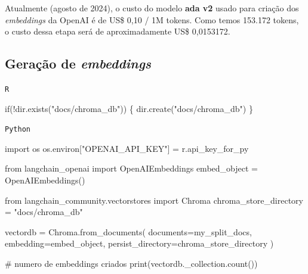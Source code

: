 \documentclass[
  letterpaper,
  DIV=11,
  numbers=noendperiod]{scrartcl}
\newenvironment{Shaded}{\begin{snugshade}}{\end{snugshade}}
\newcommand{\BuiltInTok}[1]{\textcolor[rgb]{0.00,0.23,0.31}{#1}}
\newcommand{\CommentTok}[1]{\textcolor[rgb]{0.37,0.37,0.37}{#1}}
\newcommand{\ControlFlowTok}[1]{\textcolor[rgb]{0.00,0.23,0.31}{#1}}
\newcommand{\FunctionTok}[1]{\textcolor[rgb]{0.28,0.35,0.67}{#1}}
\newcommand{\ImportTok}[1]{\textcolor[rgb]{0.00,0.46,0.62}{#1}}
\newcommand{\NormalTok}[1]{\textcolor[rgb]{0.00,0.23,0.31}{#1}}
\newcommand{\OperatorTok}[1]{\textcolor[rgb]{0.37,0.37,0.37}{#1}}
\newcommand{\SpecialCharTok}[1]{\textcolor[rgb]{0.37,0.37,0.37}{#1}}
\newcommand{\StringTok}[1]{\textcolor[rgb]{0.13,0.47,0.30}{#1}}
\begin{document}
Atualmente (agosto de 2024), o custo do modelo \textbf{ada v2} usado
para criação dos \emph{embeddings} da OpenAI é de US\$ 0,10 / 1M tokens.
Como temos 153.172 tokens, o custo dessa etapa será de aproximadamente
US\$ 0,0153172.

\hypertarget{gerauxe7uxe3o-de-embeddings}{%
\subsection{\texorpdfstring{Geração de
\emph{embeddings}}{Geração de embeddings}}\label{gerauxe7uxe3o-de-embeddings}}

\begin{codelisting}

\caption{\texttt{R}}

\begin{Shaded}
\begin{Highlighting}[]
\ControlFlowTok{if}\NormalTok{(}\SpecialCharTok{!}\FunctionTok{dir.exists}\NormalTok{(}\StringTok{"docs/chroma\_db"}\NormalTok{)) \{}
  \FunctionTok{dir.create}\NormalTok{(}\StringTok{"docs/chroma\_db"}\NormalTok{)}
\NormalTok{\}}
\end{Highlighting}
\end{Shaded}

\end{codelisting}

\begin{codelisting}

\caption{\texttt{Python}}

\begin{Shaded}
\begin{Highlighting}[]
\ImportTok{import}\NormalTok{ os}
\NormalTok{os.environ[}\StringTok{"OPENAI\_API\_KEY"}\NormalTok{] }\OperatorTok{=}\NormalTok{ r.api\_key\_for\_py }

\ImportTok{from}\NormalTok{ langchain\_openai }\ImportTok{import}\NormalTok{ OpenAIEmbeddings}
\NormalTok{embed\_object }\OperatorTok{=}\NormalTok{ OpenAIEmbeddings()}

\ImportTok{from}\NormalTok{ langchain\_community.vectorstores }\ImportTok{import}\NormalTok{ Chroma}
\NormalTok{chroma\_store\_directory }\OperatorTok{=} \StringTok{"docs/chroma\_db"}

\NormalTok{vectordb }\OperatorTok{=}\NormalTok{ Chroma.from\_documents(}
\NormalTok{    documents}\OperatorTok{=}\NormalTok{my\_split\_docs,}
\NormalTok{    embedding}\OperatorTok{=}\NormalTok{embed\_object,}
\NormalTok{    persist\_directory}\OperatorTok{=}\NormalTok{chroma\_store\_directory}
\NormalTok{)}

\CommentTok{\# numero de embeddings criados}
\BuiltInTok{print}\NormalTok{(vectordb.\_collection.count()) }
\end{Highlighting}
\end{Shaded}

\end{codelisting}
\end{document}
